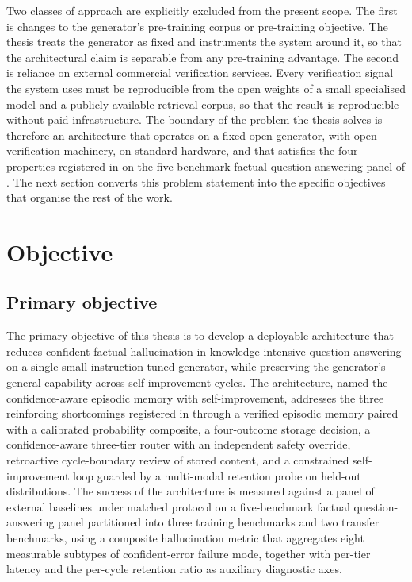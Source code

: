 Two classes of approach are explicitly excluded from the present scope. The first is changes to the generator's pre-training corpus or pre-training objective. The thesis treats the generator as fixed and instruments the system around it, so that the architectural claim is separable from any pre-training advantage. The second is reliance on external commercial verification services. Every verification signal the system uses must be reproducible from the open weights of a small specialised model and a publicly available retrieval corpus, so that the result is reproducible without paid infrastructure. The boundary of the problem the thesis solves is therefore an architecture that operates on a fixed open generator, with open verification machinery, on standard hardware, and that satisfies the four properties registered in  on the five-benchmark factual question-answering panel of . The next section converts this problem statement into the specific objectives that organise the rest of the work.

\section{Objective}
\label{sec:objective}

\subsection{Primary objective}
\label{sec:primary-objective}

The primary objective of this thesis is to develop a deployable architecture that reduces confident factual hallucination in knowledge-intensive question answering on a single small instruction-tuned generator, while preserving the generator's general capability across self-improvement cycles. The architecture, named the confidence-aware episodic memory with self-improvement, addresses the three reinforcing shortcomings registered in  through a verified episodic memory paired with a calibrated probability composite, a four-outcome storage decision, a confidence-aware three-tier router with an independent safety override, retroactive cycle-boundary review of stored content, and a constrained self-improvement loop guarded by a multi-modal retention probe on held-out distributions. The success of the architecture is measured against a panel of external baselines under matched protocol on a five-benchmark factual question-answering panel partitioned into three training benchmarks and two transfer benchmarks, using a composite hallucination metric that aggregates eight measurable subtypes of confident-error failure mode, together with per-tier latency and the per-cycle retention ratio as auxiliary diagnostic axes.

